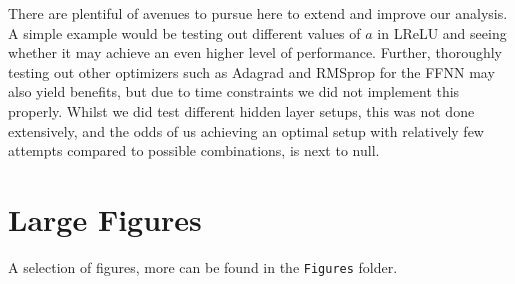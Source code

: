 \documentclass[%
reprint,s
amsmath,amssymb,
aps,
]{revtex4-2}
\begin{document}
There are plentiful of avenues to pursue here to extend and improve our analysis. A simple example would be testing out different values of $a$ in LReLU and seeing whether it may achieve an even higher level of performance. Further, thoroughly testing out other optimizers such as Adagrad and RMSprop for the FFNN may also yield benefits, but due to time constraints we did not implement this properly. Whilst we did test different hidden layer setups, this was not done extensively, and the odds of us achieving an optimal setup with relatively few attempts compared to possible combinations, is next to null. 




\appendix
\section{Large Figures}
\label{Appendix:A}
A selection of figures, more can be found in the \texttt{Figures} folder.

\end{document}
